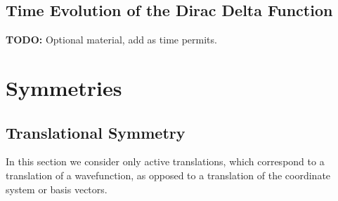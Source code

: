 \documentclass[11pt, a4paper]{article}
\begin{document}
\subsection{Time Evolution of the Dirac Delta Function}
\textbf{TODO:} Optional material, add as time permits.


\section{Symmetries}


\subsection{Translational Symmetry}
In this section we consider only active translations, which correspond to a translation of a wavefunction, as opposed to a translation of the coordinate system or basis vectors. 
\end{document}
